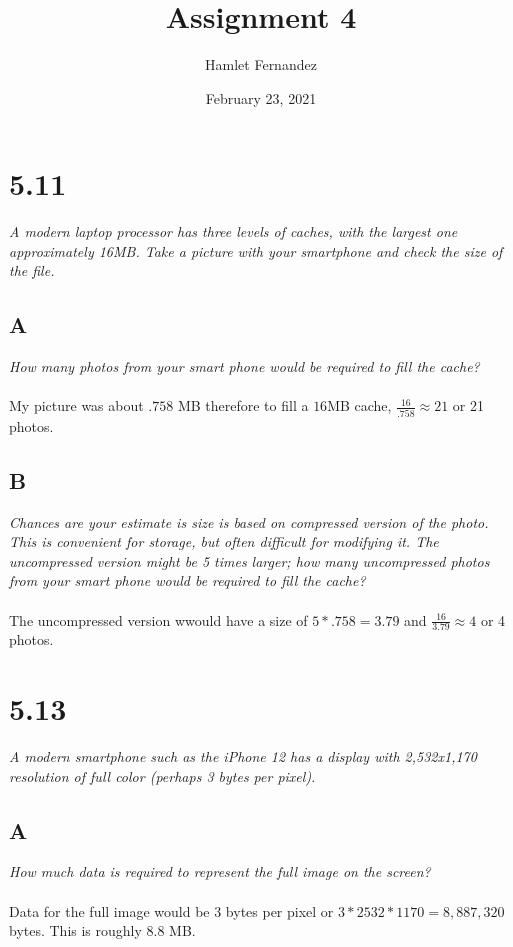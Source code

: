 \documentclass[10pt]{article}
\title{Assignment 4}
\author{Hamlet Fernandez}
\date{February 23, 2021}
\begin{document}
\maketitle{}

\section{5.11}
\textit{A modern laptop processor has three levels of caches, with the largest one 
approximately 16MB. Take a picture with your smartphone and check the size of the file.}
\subsection{A}
\textit{How many photos from your smart phone would be required to fill the cache?}
\paragraph{} My picture was about $.758$ MB therefore to fill a $16$MB cache, $\frac{16}{.758} \approx 21$ 
or 21 photos. 

\subsection{B}
\textit{Chances are your estimate is size is based on compressed version of the photo. This is
convenient for storage, but often difficult for modifying it. The uncompressed version might be 
5 times larger; how many uncompressed photos from your smart phone would be required to fill the 
cache?}
\paragraph{} The uncompressed version wwould have a size of $5 * .758 = 3.79$ and $\frac{16}{3.79} \approx 4$
or 4 photos.  

\section{5.13}
\textit{A modern smartphone such as the iPhone 12 has a display with 2,532x1,170 resolution of 
full color (perhaps 3 bytes per pixel).}
\subsection{A}
\textit{How much data is required to represent the full image on the screen?}
\paragraph{} Data for the full image would be 3 bytes per pixel or $3 * 2532 * 1170 = 8,887,320$ bytes. This 
is roughly 8.8 MB. 
\end{document}
